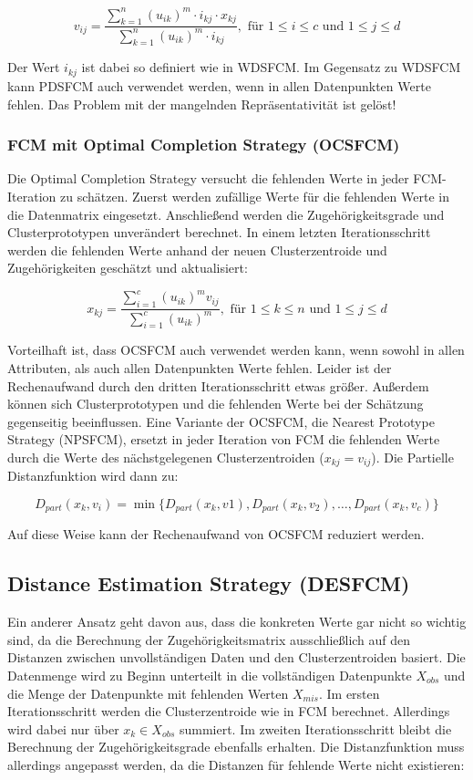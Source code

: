 \documentclass[11pt,ceqn]{book}
\begin{document}
$$v_{ij} = \frac{\sum\limits_{k=1}^n (u_{ik})^m \cdot i_{kj} \cdot x_{kj}}{\sum\limits_{k=1}^n (u_{ik})^m \cdot i_{kj}}, \text{ für } 1 \leqslant i \leqslant c \text{ und } 1 \leqslant j \leqslant d$$

Der Wert $i_{kj}$ ist dabei so definiert wie in WDSFCM. Im Gegensatz zu WDSFCM kann PDSFCM auch verwendet werden, wenn in allen Datenpunkten Werte fehlen. Das Problem mit der mangelnden Repräsentativität ist gelöst!

\subsubsection{FCM mit Optimal Completion Strategy (OCSFCM)}
Die Optimal Completion Strategy \cite{wdsfcm}\cite{pdsfcm} versucht die fehlenden Werte in jeder FCM-Iteration zu schätzen. Zuerst werden zufällige Werte für die fehlenden Werte in die Datenmatrix eingesetzt. Anschließend werden die Zugehörigkeitsgrade und Clusterprototypen unverändert berechnet. In einem letzten Iterationsschritt werden die fehlenden Werte anhand der neuen Clusterzentroide und Zugehörigkeiten geschätzt und aktualisiert:

$$x_{kj} = \frac{\sum\limits_{i=1}^c (u_{ik})^m v_{ij}}{\sum\limits_{i=1}^c (u_{ik})^m}, \text{ für } 1 \leqslant k \leqslant n \text{ und } 1 \leqslant j \leqslant d$$

Vorteilhaft ist, dass OCSFCM auch verwendet werden kann, wenn sowohl in allen Attributen, als auch allen Datenpunkten Werte fehlen. Leider ist der Rechenaufwand durch den dritten Iterationsschritt etwas größer. Außerdem können sich Clusterprototypen und die fehlenden Werte bei der Schätzung gegenseitig beeinflussen. Eine Variante der OCSFCM, die Nearest Prototype Strategy (NPSFCM), ersetzt in jeder Iteration von FCM die fehlenden Werte durch die Werte des nächstgelegenen Clusterzentroiden ($x_{kj} = v_{ij}$). Die Partielle Distanzfunktion wird dann zu:

$$D_{part}(x_k,v_i) = \min\{D_{part}(x_k,v1),D_{part}(x_k,v_2),\dots,D_{part}(x_k,v_c)\}$$

Auf diese Weise kann der Rechenaufwand von OCSFCM reduziert werden. 

\subsection{Distance Estimation Strategy (DESFCM)}
Ein anderer Ansatz \cite{desfcm} geht davon aus, dass die konkreten Werte gar nicht so wichtig sind, da die Berechnung der Zugehörigkeitsmatrix ausschließlich auf den Distanzen zwischen unvollständigen Daten und den Clusterzentroiden basiert. Die Datenmenge wird zu Beginn unterteilt in die vollständigen Datenpunkte $X_{obs}$ und die Menge der Datenpunkte mit fehlenden Werten $X_{mis}$. Im ersten Iterationsschritt werden die Clusterzentroide wie in FCM berechnet. Allerdings wird dabei nur über $x_k \in X_{obs}$ summiert. Im zweiten Iterationsschritt bleibt die Berechnung der Zugehörigkeitsgrade ebenfalls erhalten. Die Distanzfunktion muss allerdings angepasst werden, da die Distanzen für fehlende Werte nicht existieren:
\end{document}
